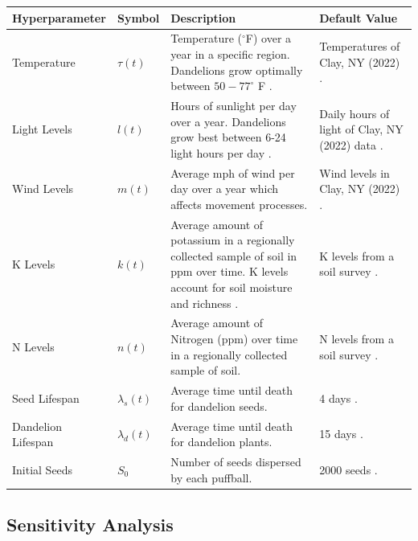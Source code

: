 \begin{table}[h!]
\renewcommand{\arraystretch}{1.3}
    \begin{tabularx}{\textwidth}{p{}lp{}X}
    \toprule
    \textbf{Hyperparameter}  & \textbf{Symbol} & \textbf{Description} & \textbf{Default Value} \\ \midrule
    \raggedright Temperature & \(\tau(t)\)   & Temperature (\(^\circ\)F) over a year in a specific region. Dandelions grow optimally between \(50-77^\circ\) F \cite{noauthor_dandelion_nodate-2}. & Temperatures of Clay, NY (2022) \cite{aladin_wolcott_nodate}. \\
    \rowcolor{gray!15}
    \raggedright Light Levels & \(l(t)\)  & Hours of sunlight per day over a year. Dandelions grow best between 6-24 light hours per day \cite{stewart-wade_biology_2002}. & Daily hours of light of Clay, NY (2022) data \cite{aladin_wolcott_nodate}.\\
    \raggedright Wind Levels & \(m(t)\) & Average mph of wind per day over a year which affects movement processes. & Wind levels in Clay, NY (2022) \cite{aladin_wolcott_nodate}. \\
   \rowcolor{gray!15} \raggedright K Levels & \(k(t)\) & Average amount of potassium in a regionally collected sample of soil in ppm over time. K levels account for soil moisture and richness \cite{noauthor_potassium_nodate}. & K levels from a soil survey \cite{communications_interpreting_2018}.\\
      \raggedright N Levels & \(n(t)\) & Average amount of Nitrogen (ppm) over time in a regionally collected sample of soil. & N levels from a soil survey \cite{pritchett_nitrogen_1959}.\\
    \rowcolor{gray!15} \raggedright Seed Lifespan & \(\lambda_s(t)\) & Average time until death for dandelion seeds. & 4 days \cite{noauthor_dandelion_nodate}. \\
    \raggedright Dandelion Lifespan & \(\lambda_d(t)\) & Average time until death for dandelion plants. & 15 days \cite{farmshowGrowingDandelions}. \\
     \rowcolor{gray!15} \raggedright Initial Seeds & \(S_0\) & Number of seeds dispersed by each puffball. & 2000 seeds \cite{noauthor_dandelion_nodate-2}. \\
    \bottomrule
    \end{tabularx}
\end{table}

\subsection{Sensitivity Analysis}

